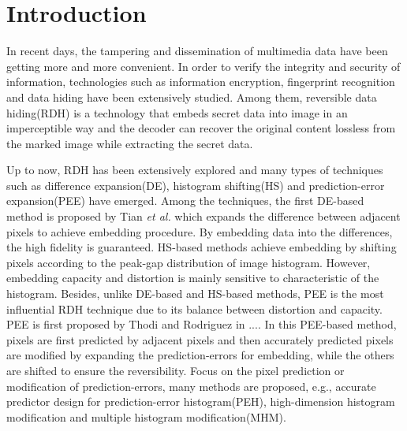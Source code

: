 \documentclass[review,3p,10pt,sort&compress]{elsarticle}
\begin{document}
\section{Introduction}\label{sec:1}
In recent days, the tampering and dissemination of multimedia data have been getting more and more convenient. In order to verify the integrity and security of information, technologies such as information encryption, fingerprint recognition and data hiding have been extensively studied. Among them, reversible data hiding(RDH) is a technology that embeds secret data into image in an imperceptible way and the decoder can recover the original content lossless from the marked image while extracting the secret data.

Up to now, RDH has been extensively explored and many types of techniques such as difference expansion(DE), histogram shifting(HS) and prediction-error expansion(PEE) have emerged. Among the techniques, the first DE-based method is proposed by Tian \emph{et al.} which expands the difference between adjacent pixels to achieve embedding procedure. By embedding data into the differences, the high fidelity is guaranteed. HS-based methods achieve embedding by shifting pixels according to the peak-gap distribution of image histogram. However, embedding capacity and distortion is mainly sensitive to characteristic of the histogram. Besides, unlike DE-based and HS-based methods, PEE is the most influential RDH technique due to its balance between distortion and capacity. PEE is first proposed by Thodi and Rodriguez in .... In this PEE-based method, pixels are first predicted by adjacent pixels and then accurately predicted pixels are modified by expanding the prediction-errors for embedding, while the others are shifted to ensure the reversibility. Focus on the pixel prediction or modification of prediction-errors, many methods are proposed, e.g., accurate predictor design for prediction-error histogram(PEH), high-dimension histogram modification and multiple histogram modification(MHM).
\end{document}
